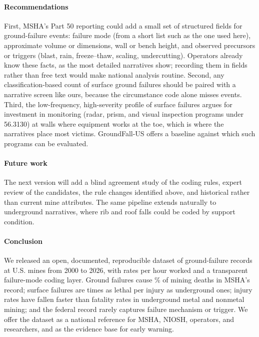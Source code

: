 \documentclass[letterpaper,twocolumn,10pt]{article}
\begin{document}
\paragraph{Recommendations} First, MSHA's Part 50 reporting could add a small set of structured fields for ground-failure events: failure mode (from a short list such as the one used here), approximate volume or dimensions, wall or bench height, and observed precursors or triggers (blast, rain, freeze--thaw, scaling, undercutting). Operators already know these facts, as the most detailed narratives show; recording them in fields rather than free text would make national analysis routine. Second, any classification-based count of surface ground failures should be paired with a narrative screen like ours, because the circumstance code alone misses events. Third, the low-frequency, high-severity profile of surface failures argues for investment in monitoring (radar, prism, and visual inspection programs under 56.3130) at walls where equipment works at the toe, which is where the narratives place most victims. GroundFall-US offers a baseline against which such programs can be evaluated.

\paragraph{Future work} The next version will add a blind agreement study of the coding rules, expert review of the \NCand{} candidates, the rule changes identified above, and historical rather than current mine attributes. The same pipeline extends naturally to underground narratives, where rib and roof falls could be coded by support condition.

\paragraph{Conclusion} We released an open, documented, reproducible dataset of \NGF{} ground-failure records at U.S. mines from 2000 to 2026, with rates per hour worked and a transparent failure-mode coding layer. Ground failures cause \PctGFofFatal\% of mining deaths in MSHA's record; surface failures are \CFRSurfVsUG{} times as lethal per injury as underground ones; injury rates have fallen faster than fatality rates in underground metal and nonmetal mining; and the federal record rarely captures failure mechanism or trigger. We offer the dataset as a national reference for MSHA, NIOSH, operators, and researchers, and as the evidence base for early warning.
\end{document}
